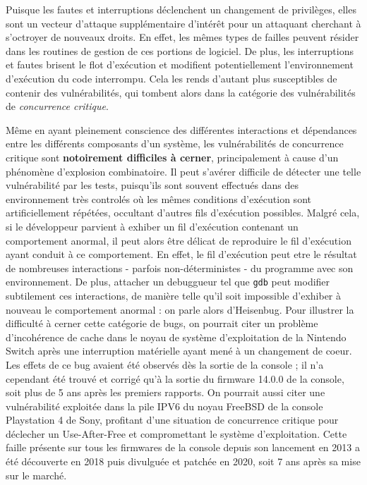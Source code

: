 Puisque les fautes et interruptions déclenchent un changement de privilèges, elles sont un vecteur d'attaque supplémentaire d'intérêt pour un attaquant cherchant à s'octroyer de nouveaux droits. En effet, les mêmes types de failles peuvent résider dans les routines de gestion de ces portions de logiciel. De plus, les interruptions et fautes brisent le flot d'exécution et modifient potentiellement l'environnement d'exécution du code interrompu. Cela les rends d'autant plus susceptibles de contenir des vulnérabilités, qui tombent alors dans la catégorie des vulnérabilités de \emph{concurrence critique}.

Même en ayant pleinement conscience des différentes interactions et dépendances entre les différents composants d'un système, les vulnérabilités de concurrence critique sont \textbf{notoirement difficiles à cerner}, principalement à cause d'un phénomène d'explosion combinatoire. Il peut s'avérer difficile de détecter une telle vulnérabilité par les tests, puisqu'ils sont souvent effectués dans des environnement très controlés où les mêmes conditions d'exécution sont artificiellement répétées, occultant d'autres fils d'exécution possibles. Malgré cela, si le développeur parvient à exhiber un fil d'exécution contenant un comportement anormal, il peut alors être délicat de reproduire le fil d'exécution ayant conduit à ce comportement. En effet, le fil d'exécution peut etre le résultat de nombreuses interactions - parfois non-déterministes - du programme avec son environnement. De plus, attacher un debuggueur tel que \texttt{gdb} peut modifier subtilement ces interactions, de manière telle qu'il soit impossible d'exhiber à nouveau le comportement anormal : on parle alors d'Heisenbug. Pour illustrer la difficulté à cerner cette catégorie de bugs, on pourrait citer un problème d'incohérence de cache dans le noyau de système d'exploitation de la Nintendo Switch après une interruption matérielle ayant mené à un changement de coeur. Les effets de ce bug avaient été observés dès la sortie de la console ; il n'a cependant été trouvé et corrigé qu'à la sortie du firmware 14.0.0 de la console, soit plus de 5 ans après les premiers rapports. %
On pourrait aussi citer une vulnérabilité exploitée dans la pile IPV6 du noyau FreeBSD de la console Playstation 4 de Sony, profitant d'une situation de concurrence critique pour déclecher un Use-After-Free et compromettant le système d'exploitation. Cette faille présente sur tous les firmwares de la console depuis son lancement en 2013 a été découverte en 2018 puis divulguée et patchée en 2020, soit 7 ans après sa mise sur le marché.


